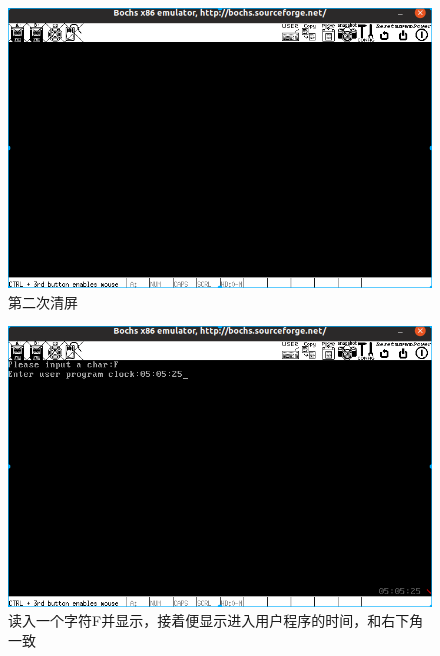 \documentclass[a4paper,11pt,UTF8]{ctexart}
\newcommand{\bottomcaption}{%
\setlength{\abovecaptionskip}{6pt}%
\setlength{\belowcaptionskip}{6pt}%
\caption}
\begin{document}
	\begin{figure}[htbp]
		\centering
		\includegraphics[width=15cm]{img/7.png}
		\bottomcaption{第二次清屏}
	\end{figure}
	\begin{figure}[htbp]
		\centering
		\includegraphics[width=15cm]{img/8.png}
		\bottomcaption{读入一个字符F并显示，接着便显示进入用户程序的时间，和右下角一致}
	\end{figure}
	\clearpage

\end{document}
